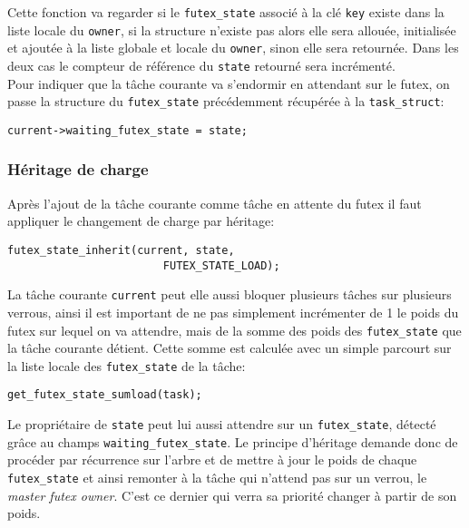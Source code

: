 Cette fonction va regarder si le \verb|futex_state| associé à la clé \verb|key| existe
dans la liste locale du \verb|owner|,
si la structure n'existe pas alors elle sera allouée, initialisée et ajoutée à la liste 
globale et locale du \verb|owner|, sinon elle sera retournée.
Dans les deux cas le compteur de référence du \verb|state| retourné sera incrémenté.
\\

Pour indiquer que la tâche courante va s'endormir en attendant sur le futex, on passe la structure
du \verb|futex_state| précédemment récupérée à la \verb|task_struct|:
\begin{lstlisting}[tabsize=4]
	current->waiting_futex_state = state;
\end{lstlisting}

\subsubsection{Héritage de charge}

Après l'ajout de la tâche courante comme tâche en attente du futex il faut appliquer le changement de charge
par héritage:
\begin{lstlisting}[tabsize=4]
	futex_state_inherit(current, state, 
						FUTEX_STATE_LOAD);
\end{lstlisting}

La tâche courante \verb|current| peut elle aussi bloquer plusieurs tâches sur plusieurs verrous, ainsi il est important de ne pas
simplement incrémenter de 1 le poids du futex sur lequel on va attendre, mais de la somme des poids
des \verb|futex_state| que la tâche courante détient. Cette somme est calculée avec un simple parcourt sur la
liste locale des \verb|futex_state| de la tâche:
\begin{lstlisting}[tabsize=4]
	get_futex_state_sumload(task);
\end{lstlisting}

Le propriétaire de \verb|state| peut lui aussi attendre sur un \verb|futex_state|,
détecté grâce au champs \verb|waiting_futex_state|. 
Le principe d'héritage demande donc
de procéder par récurrence sur l'arbre et de mettre à jour le poids de chaque \verb|futex_state|
et ainsi remonter à la tâche qui n'attend pas sur un verrou, le \textit{master futex owner}.
C'est ce dernier qui verra sa priorité changer à partir de son poids.

